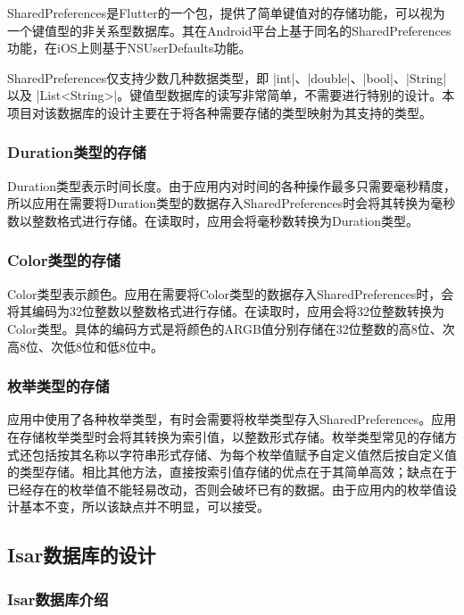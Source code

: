 SharedPreferences是Flutter的一个包，提供了简单键值对的存储功能，可以视为一个键值型的非关系型数据库。其在Android平台上基于同名的SharedPreferences功能，在iOS上则基于NSUserDefaults功能。

SharedPreferences仅支持少数几种数据类型，即 |int|、|double|、|bool|、|String| 以及 |List<String>|。键值型数据库的读写非常简单，不需要进行特别的设计。本项目对该数据库的设计主要在于将各种需要存储的类型映射为其支持的类型。

\subsubsection{Duration类型的存储}\label{subsubsec:duration-storage}

Duration类型表示时间长度。由于应用内对时间的各种操作最多只需要毫秒精度，所以应用在需要将Duration类型的数据存入SharedPreferences时会将其转换为毫秒数以整数格式进行存储。在读取时，应用会将毫秒数转换为Duration类型。

\subsubsection{Color类型的存储}\label{subsubsec:color-storage}

Color类型表示颜色。应用在需要将Color类型的数据存入SharedPreferences时，会将其编码为32位整数以整数格式进行存储。在读取时，应用会将32位整数转换为Color类型。具体的编码方式是将颜色的ARGB值分别存储在32位整数的高8位、次高8位、次低8位和低8位中。

\subsubsection{枚举类型的存储}\label{subsubsec:enum-storage}

应用中使用了各种枚举类型，有时会需要将枚举类型存入SharedPreferences。应用在存储枚举类型时会将其转换为索引值，以整数形式存储。枚举类型常见的存储方式还包括按其名称以字符串形式存储、为每个枚举值赋予自定义值然后按自定义值的类型存储。相比其他方法，直接按索引值存储的优点在于其简单高效；缺点在于已经存在的枚举值不能轻易改动，否则会破坏已有的数据。由于应用内的枚举值设计基本不变，所以该缺点并不明显，可以接受。

\subsection{Isar数据库的设计}\label{subsec:isar}

\subsubsection{Isar数据库介绍}\label{subsubsec:isar-intro}

